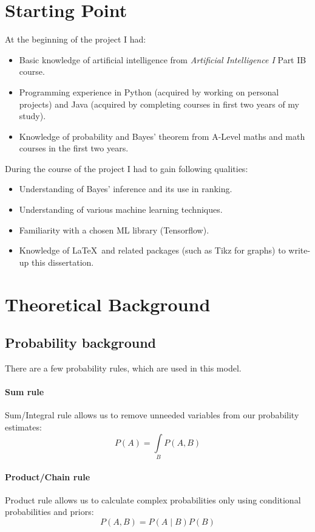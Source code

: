 \documentclass[12pt,a4paper]{book}
\begin{document}
\section{Starting Point}
\noindent
At the beginning of the project I had:
\begin{itemize}
\item Basic knowledge of artificial intelligence from \emph{Artificial Intelligence I} Part IB course.
\item Programming experience in Python (acquired by working on personal projects) and Java (acquired by completing courses in first two years of my study).
\item Knowledge of probability and Bayes' theorem from A-Level maths and math courses in the first two years.
\end{itemize}
During the course of the project I had to gain following qualities:
\begin{itemize}
\item Understanding of Bayes' inference and its use in ranking.
\item Understanding of various machine learning techniques.
\item Familiarity with a chosen ML library (Tensorflow).
\item Knowledge of \LaTeX\ and related packages (such as Tikz for graphs) to write-up this dissertation.
\end{itemize}
\section{Theoretical Background}
\subsection{Probability background}
There are a few probability rules, which are used in this model.
\paragraph{Sum rule}
Sum/Integral rule allows us to remove unneeded variables from our probability estimates:
\begin{equation}
P(A) = \int\limits_{B}P(A,B)
\end{equation}
\paragraph{Product/Chain rule}
Product rule allows us to calculate complex probabilities only using conditional probabilities and priors:
\begin{equation}
P(A,B) = P(A\mid B)P(B)
\end{equation} 
\end{document}

